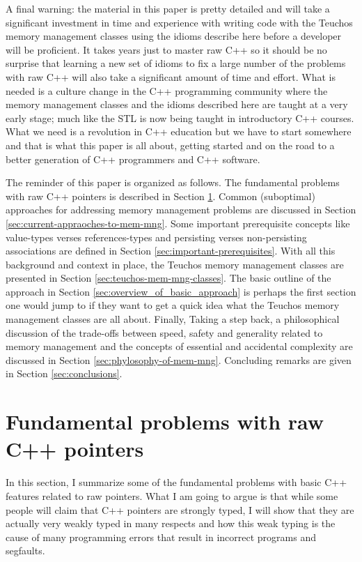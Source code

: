 \documentclass[pdf,ps2pdf,11pt]{SANDreport}
\begin{document}
A final warning: the material in this paper is pretty detailed and
will take a significant investment in time and experience with writing
code with the Teuchos memory management classes using the idioms
describe here before a developer will be proficient.  It takes years
just to master raw C++ so it should be no surprise that learning a new
set of idioms to fix a large number of the problems with raw C++ will
also take a significant amount of time and effort.  What is needed is
a culture change in the C++ programming community where the memory
management classes and the idioms described here are taught at a very
early stage; much like the STL is now being taught in introductory C++
courses.  What we need is a revolution in C++ education but we have to
start somewhere and that is what this paper is all about, getting
started and on the road to a better generation of C++ programmers and
C++ software.

The reminder of this paper is organized as follows. The fundamental
problems with raw C++ pointers is described in Section
{}\ref{sec:problems-with-raw-pointers}.  Common (suboptimal)
approaches for addressing memory management problems are discussed in
Section {}\ref{sec:current-appraoches-to-mem-mng}.  Some important
prerequisite concepts like value-types verses references-types and
persisting verses non-persisting associations are defined in Section
{}\ref{sec:important-prerequisites}.  With all this background and
context in place, the Teuchos memory management classes are presented
in Section {}\ref{sec:teuchos-mem-mng-classes}.  The basic outline of
the approach in Section {}\ref{sec:overview_of_basic_approach} is
perhaps the first section one would jump to if they want to get a
quick idea what the Teuchos memory management classes are all about.
Finally, Taking a step back, a philosophical discussion of the
trade-offs between speed, safety and generality related to memory
management and the concepts of essential and accidental complexity are
discussed in Section {}\ref{sec:phylosophy-of-mem-mng}.  Concluding
remarks are given in Section {}\ref{sec:conclusions}.


%
{}\section{Fundamental problems with raw C++ pointers}
\label{sec:problems-with-raw-pointers}
%

In this section, I summarize some of the fundamental problems with
basic C++ features related to raw pointers.  What I am going to argue
is that while some people will claim that C++ pointers are strongly
typed, I will show that they are actually very weakly typed in many
respects and how this weak typing is the cause of many programming
errors that result in incorrect programs and segfaults.
\end{document}
